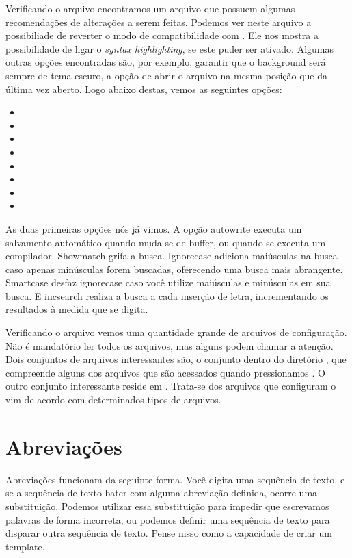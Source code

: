 Verificando o arquivo  encontramos um arquivo que possuem algumas
recomendações de alterações a serem feitas.
Podemos ver neste arquivo a possibiliade de reverter o modo de compatibilidade com .
Ele nos mostra a possibilidade de ligar o \emph{syntax highlighting}, se este puder ser ativado.
Algumas outras opções encontradas são, por exemplo, garantir que o background será sempre de tema escuro,
a opção de abrir o arquivo na mesma posição que da última vez aberto.
Logo abaixo destas, vemos as seguintes opções:
\begin{multicols}{3}
\begin{itemize}
	\item {}
	\item {}
	\item {}
	\item {}
	\item {}
	\item {}
	\item {}
	\item {}
\end{itemize}
\end{multicols}

As duas primeiras opções nós já vimos.
A opção autowrite executa um salvamento automático quando muda-se de buffer,
ou quando se executa um compilador.
Showmatch grifa a busca.
Ignorecase adiciona maiúsculas na busca caso apenas minúsculas forem buscadas,
oferecendo uma busca mais abrangente.
Smartcase desfaz ignorecase caso você utilize maiúsculas e minúsculas em sua busca.
E incsearch realiza a busca a cada inserção de letra, incrementando os resultados à medida que se digita.

Verificando o arquivo  vemos uma quantidade grande de arquivos de configuração.
Não é mandatório ler todos os arquivos, mas alguns podem chamar a atenção.
Dois conjuntos de arquivos interessantes são, o conjunto dentro do diretório , que compreende
alguns dos arquivos que são acessados quando pressionamos .
O outro conjunto interessante reside em .
Trata-se dos arquivos que configuram o vim de acordo com determinados tipos de arquivos.

\section{Abreviações}
Abreviações funcionam da seguinte forma.
Você digita uma sequência de texto, e se a sequência de texto bater com alguma abreviação definida, ocorre uma substituição.
Podemos utilizar essa substituição para impedir que escrevamos palavras de forma incorreta, ou podemos definir uma sequência de texto
para disparar outra sequência de texto.
Pense nisso como a capacidade de criar um template.


